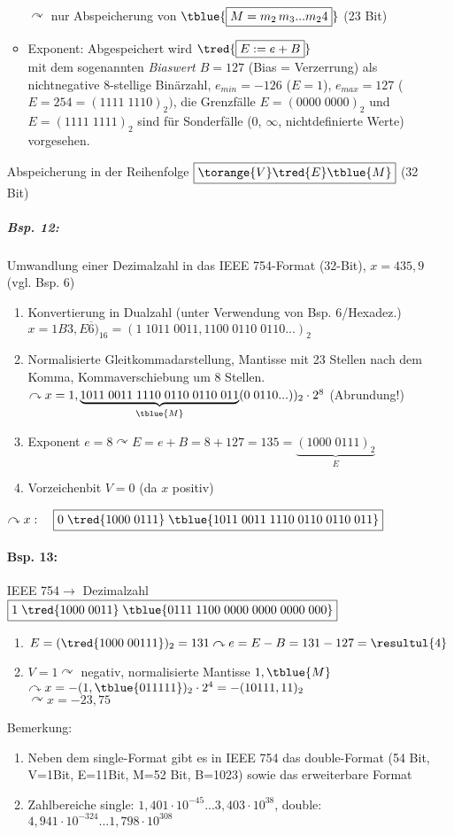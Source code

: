 \begin{enumerate}
\begin{itemize}
$\curvearrowright$ nur Abspeicherung von $\tblue{\boxed{M=m_2\,m_3...m_24}}$ (23 Bit)
\item Exponent: Abgespeichert wird $\tred{\boxed{E:=e+B}} $ \\
mit dem sogenannten \emph{Biaswert $B=127$} (Bias = Verzerrung) als nichtnegative 8-stellige Binärzahl, $e_{min}=-126 $ ($E=1$), $e_{max}=127$ ($E=254=(1111\;1110)_2)$, die Grenzfälle $E=(0000\;0000)_2$ und $E=(1111\;1111)_2$ sind für Sonderfälle ($0$, $\infty$, nichtdefinierte Werte) vorgesehen.
\end{itemize}
Abspeicherung in der Reihenfolge $\boxed{\torange{V}\tred{E}\tblue{M}}$ (32 Bit)
\subparagraph{Bsp. 12:} Umwandlung einer Dezimalzahl in das IEEE 754-Format (32-Bit), $x=435,9$ (vgl. Bsp. 6)
\begin{enumerate}[label=\arabic*.)]
\item Konvertierung in Dualzahl (unter Verwendung von Bsp. 6/Hexadez.)\\
$x=1B3,E\overline{6})_{16}=(1\; 1011\;0011,1100\;0110\;0110 ...)_2$
\item Normalisierte Gleitkommadarstellung, Mantisse mit 23 Stellen nach dem Komma, Kommaverschiebung um 8 Stellen.\\
$\curvearrowright x = 1, \underbrace{1011\;0011\;1110\;0110\;0110\;011}_{\tblue{M}}(0\; 0110...))_2\cdot 2^8$ \quad (Abrundung!)
\item Exponent $e=8\curvearrowright E=e+B=8+127=135=\underbrace{(1000\;0111)_2}_{E}$
\item Vorzeichenbit $V=0$ (da $x$ positiv)
\end{enumerate}
$\curvearrowright x: \quad \boxed{0 \; \tred{1000\;0111}\;\tblue{1011\;0011\;1110\;0110\;0110\;011}}$
\paragraph{Bsp. 13:} IEEE 754$\rightarrow$ Dezimalzahl\\
$\boxed{1\;\tred{1000\;0011}\;\tblue{0111\; 1100 \; 0000\;0000\;0000 \; 000}}$
\begin{enumerate}[label=\arabic*.)]
\item $E=(\tred{1000\;00111})_2=131\curvearrowright e=E-B=131-127=\resultul{4}$
\item $V=1\curvearrowright$ negativ, normalisierte Mantisse $1,\tblue{M}$\\
$\curvearrowright x=-(1,\tblue{011111})_2\cdot 2^4=-(10111,11)_2$\\
$\curvearrowright x = -23,75$
\end{enumerate}
Bemerkung: 
\begin{enumerate}[label=\arabic*.)]
\item Neben dem single-Format gibt es in IEEE 754 das double-Format (54 Bit, V=1Bit, E=11Bit, M=52 Bit, B=1023) sowie das erweiterbare Format
\item Zahlbereiche single: $1,401\cdot 10^{-45}...3,403\cdot 10^{38}$, double: $4,941\cdot 10^{-324}...1,798\cdot 10^{308}$
\end{enumerate}
\end{enumerate}
